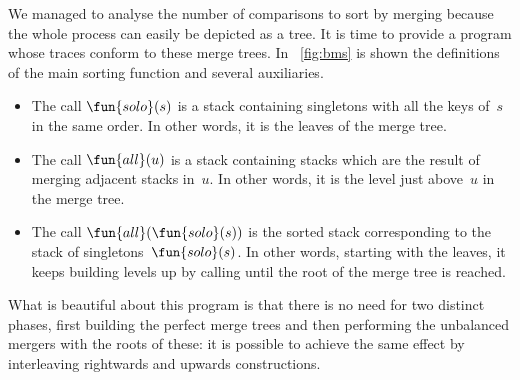 We managed to analyse the number of comparisons to sort by merging
because the whole process can easily be depicted as a
tree. It is time to provide a program whose
traces conform to these merge trees. In \fig~\vref{fig:bms} is shown
the definitions of the main sorting function
 and several auxiliaries.
\begin{itemize}

  \item The call \(\fun{solo}(s)\) is a stack
    containing singletons with all the keys of~\(s\) in the same
    order. In other words, it is the leaves of the merge tree.

  \item The call \(\fun{all}(u)\) is a stack
    containing stacks which are the result of merging adjacent stacks
    in~\(u\). In other words, it is the level just above~\(u\) in the
    merge tree.

  \item The call \(\fun{all}(\fun{solo}(s))\) is the sorted stack
    corresponding to the stack of singletons~\(\fun{solo}(s)\). In
    other words, starting with the leaves, it keeps building levels up
    by calling  until the root of
    the merge tree is reached.

\end{itemize}
What is beautiful about this program is that there is no need for two
distinct phases, first building the perfect merge trees and then
performing the unbalanced mergers with the roots of these: it is
possible to achieve the same effect by interleaving rightwards and
upwards constructions.
